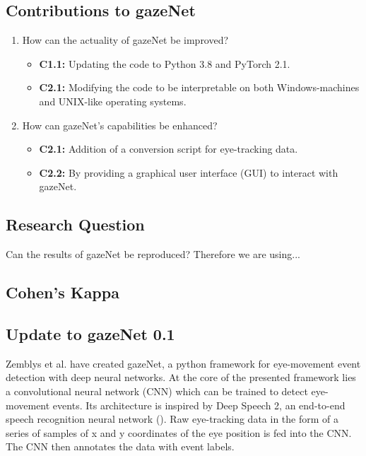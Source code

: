 \documentclass[acmlarge]{acmart}
\begin{document}
\subsection{Contributions to gazeNet}
\begin{enumerate}
    \item How can the actuality of gazeNet be improved?
    \label{actuality}
          \begin{itemize}
              \item \textbf{C1.1:} Updating the code to Python 3.8 and PyTorch 2.1.
              \item \textbf{C2.1:} Modifying the code to be interpretable on both Windows-machines and UNIX-like operating systems.
          \end{itemize}
    \item How can gazeNet's capabilities be enhanced?
    \label{capabilities}
              \begin{itemize}
              \item \textbf{C2.1:} Addition of a conversion script for eye-tracking data.
              \item \textbf{C2.2:} By providing a graphical user interface (GUI) to interact with gazeNet.
          \end{itemize}
\end{enumerate}

\subsection{Research Question}
Can the results of gazeNet be reproduced? Therefore we are using...

\subsection{Cohen's Kappa}

\subsection{Update to gazeNet 0.1}
Zemblys et al. \cite{zemblys2018gazeNet} have created gazeNet, a python framework for eye-movement event detection with deep neural networks. At the core of the presented framework lies a convolutional neural network (CNN) which can be trained to detect eye-movement events. Its architecture is inspired by Deep Speech 2, an end-to-end speech recognition neural network (\cite{deep_speech_2,zemblys2018gazeNet}). Raw eye-tracking data in the form of a series of samples of x and y coordinates of the eye position is fed into the CNN. The CNN then annotates the data with event labels.
\end{document}
